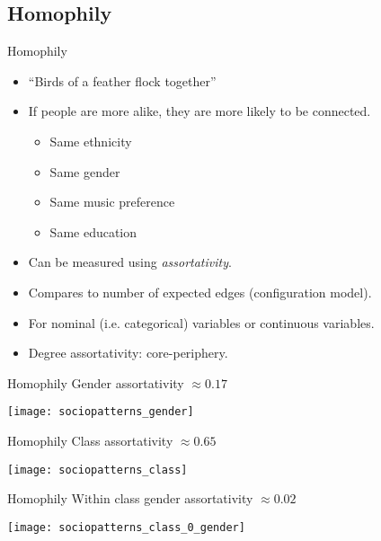 \documentclass[hide notes,compress]{beamer}
\begin{document}
\subsection{Homophily}

\begin{frame}[c]{Homophily}
  \begin{itemize}
    \item ``Birds of a feather flock together''
    \item If people are more alike, they are more likely to be connected.
      \begin{itemize}
        \item Same ethnicity
        \item Same gender
        \item Same music preference
        \item Same education
      \end{itemize}
    \item Can be measured using \emph{assortativity}.
    \item Compares to number of expected edges (configuration model).
    \item For nominal (i.e. categorical) variables or continuous variables.
    \item Degree assortativity: core-periphery.
  \end{itemize}
\end{frame}

\begin{frame}[c]{Homophily}
  Gender assortativity $\approx 0.17$
  \begin{center}
    \texttt{[image: sociopatterns\_gender]}
  \end{center}
\end{frame}

\begin{frame}[c]{Homophily}
  Class assortativity $\approx 0.65$
  \begin{center}
    \texttt{[image: sociopatterns\_class]}
  \end{center}
\end{frame}

\begin{frame}[c]{Homophily}
  Within class gender assortativity $\approx 0.02$
  \begin{center}
    \texttt{[image: sociopatterns\_class\_0\_gender]}
  \end{center}
\end{frame}
\end{document}
